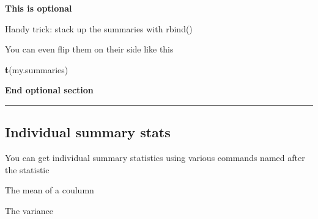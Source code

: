 \documentclass[]{book}
\newenvironment{Shaded}{\begin{snugshade}}{\end{snugshade}}
\newcommand{\KeywordTok}[1]{\textcolor[rgb]{0.13,0.29,0.53}{\textbf{#1}}}
\newcommand{\StringTok}[1]{\textcolor[rgb]{0.31,0.60,0.02}{#1}}
\newcommand{\OperatorTok}[1]{\textcolor[rgb]{0.81,0.36,0.00}{\textbf{#1}}}
\newcommand{\NormalTok}[1]{#1}
\theoremstyle{definition}
\theoremstyle{definition}
\theoremstyle{definition}
\theoremstyle{remark}
\begin{document}
\textbf{This is optional}

Handy trick: stack up the summaries with rbind()

\begin{Shaded}
\end{Shaded}

You can even flip them on their side like this

\begin{Shaded}
\end{Shaded}

\begin{Shaded}
\begin{Highlighting}[]
\KeywordTok{t}\NormalTok{(my.summaries)}
\end{Highlighting}
\end{Shaded}

\textbf{End optional section}

\begin{center}\rule{0.5\linewidth}{\linethickness}\end{center}

\subsection{Individual summary stats}\label{individual-summary-stats}

You can get individual summary statistics using various commands named
after the statistic

The mean of a coulumn

\begin{Shaded}
\end{Shaded}

The variance
\end{document}
